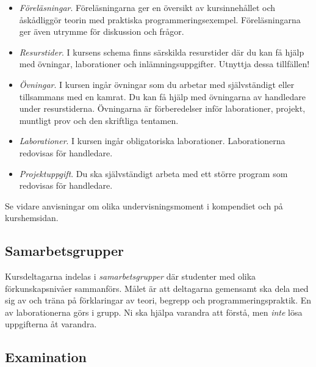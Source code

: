 \documentclass[a4paper,12pt,oneside]{memoir}
\begin{document}
\begin{itemize}
\item
  \emph{Föreläsningar}. Föreläsningarna ger en översikt av
  kursinnehållet och åskådliggör teorin med praktiska
  programmeringsexempel. Föreläsningarna ger även utrymme för diskussion
  och frågor.
\item
  \emph{Resurstider}. I kursens schema finns särskilda resurstider
  där du kan få hjälp med övningar, laborationer och
  inlämningsuppgifter. Utnyttja dessa tillfällen!
\item
  \emph{Övningar}. I kursen ingår övningar som du arbetar med
  självständigt eller tillsammans med en kamrat.
  Du kan få hjälp med övningarna av handledare under resurstiderna.
  Övningarna är förberedelser inför laborationer, projekt, muntligt prov och den skriftliga tentamen.
\item
  \emph{Laborationer}. I kursen ingår obligatoriska laborationer.
  Laborationerna redovisas för handledare.
\item
  \emph{Projektuppgift}. Du ska självständigt arbeta med ett större
  program som redovisas för handledare. %
\end{itemize}
Se vidare anvisningar om olika undervisningsmoment i kompendiet och på kurshemsidan.

\subsection{Samarbetsgrupper}\label{samarbetsgrupper}

Kursdeltagarna indelas i \emph{samarbetsgrupper} där studenter med olika förkunskapsnivåer
sammanförs. Målet är att deltagarna gemensamt ska
dela med sig av och träna på förklaringar av teori, begrepp och
programmeringspraktik. En av laborationerna görs i grupp. Ni ska hjälpa varandra att
förstå, men \emph{inte} lösa uppgifterna åt varandra.

\subsection{Examination}\label{examination}
\end{document}
